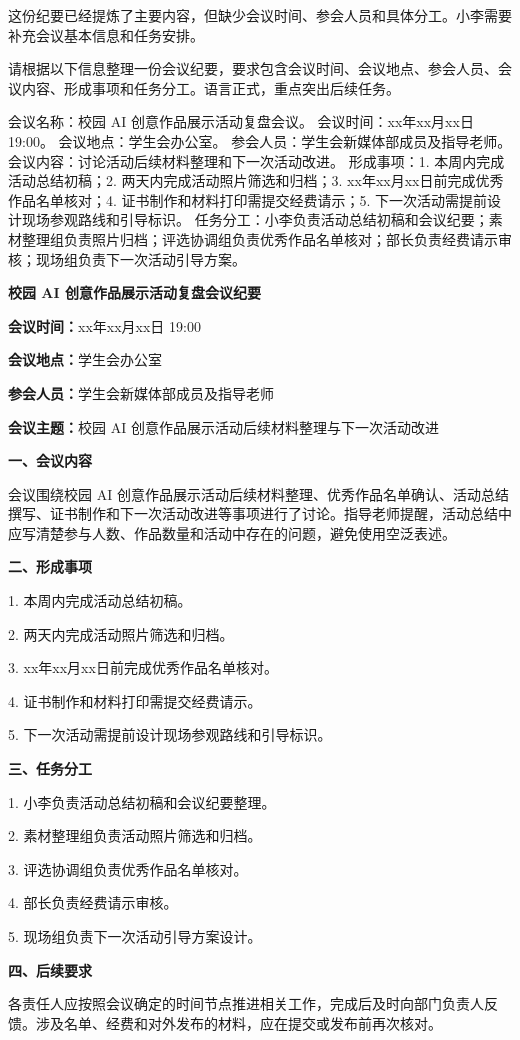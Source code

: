 这份纪要已经提炼了主要内容，但缺少会议时间、参会人员和具体分工。小李需要补充会议基本信息和任务安排。

\begin{userbox}
请根据以下信息整理一份会议纪要，要求包含会议时间、会议地点、参会人员、会议内容、形成事项和任务分工。语言正式，重点突出后续任务。

会议名称：校园 AI 创意作品展示活动复盘会议。
会议时间：xx年xx月xx日 19:00。
会议地点：学生会办公室。
参会人员：学生会新媒体部成员及指导老师。
会议内容：讨论活动后续材料整理和下一次活动改进。
形成事项：1. 本周内完成活动总结初稿；2. 两天内完成活动照片筛选和归档；3. xx年xx月xx日前完成优秀作品名单核对；4. 证书制作和材料打印需提交经费请示；5. 下一次活动需提前设计现场参观路线和引导标识。
任务分工：小李负责活动总结初稿和会议纪要；素材整理组负责照片归档；评选协调组负责优秀作品名单核对；部长负责经费请示审核；现场组负责下一次活动引导方案。
\end{userbox}

\begin{aibox}
\begin{center}
\textbf{校园 AI 创意作品展示活动复盘会议纪要}
\end{center}

\textbf{会议时间：}xx年xx月xx日 19:00

\textbf{会议地点：}学生会办公室

\textbf{参会人员：}学生会新媒体部成员及指导老师

\textbf{会议主题：}校园 AI 创意作品展示活动后续材料整理与下一次活动改进

\textbf{一、会议内容}

会议围绕校园 AI 创意作品展示活动后续材料整理、优秀作品名单确认、活动总结撰写、证书制作和下一次活动改进等事项进行了讨论。指导老师提醒，活动总结中应写清楚参与人数、作品数量和活动中存在的问题，避免使用空泛表述。

\textbf{二、形成事项}

1. 本周内完成活动总结初稿。

2. 两天内完成活动照片筛选和归档。

3. xx年xx月xx日前完成优秀作品名单核对。

4. 证书制作和材料打印需提交经费请示。

5. 下一次活动需提前设计现场参观路线和引导标识。

\textbf{三、任务分工}

1. 小李负责活动总结初稿和会议纪要整理。

2. 素材整理组负责活动照片筛选和归档。

3. 评选协调组负责优秀作品名单核对。

4. 部长负责经费请示审核。

5. 现场组负责下一次活动引导方案设计。

\textbf{四、后续要求}

各责任人应按照会议确定的时间节点推进相关工作，完成后及时向部门负责人反馈。涉及名单、经费和对外发布的材料，应在提交或发布前再次核对。
\end{aibox}

